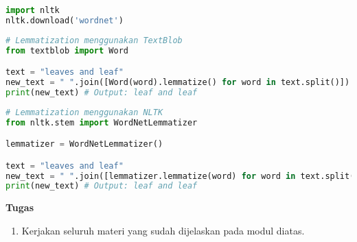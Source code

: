 \documentclass{article}
\begin{document}
    \begin{lstlisting}[language=python, style=pythonstyle]
import nltk
nltk.download('wordnet')
    \end{lstlisting}

    \begin{lstlisting}[language=python, style=pythonstyle]
# Lemmatization menggunakan TextBlob
from textblob import Word

text = "leaves and leaf"
new_text = " ".join([Word(word).lemmatize() for word in text.split()])
print(new_text) # Output: leaf and leaf
    \end{lstlisting}
    
    \begin{lstlisting}[language=python, style=pythonstyle]
# Lemmatization menggunakan NLTK
from nltk.stem import WordNetLemmatizer

lemmatizer = WordNetLemmatizer()

text = "leaves and leaf"
new_text = " ".join([lemmatizer.lemmatize(word) for word in text.split()])
print(new_text) # Output: leaf and leaf
    \end{lstlisting}

    \newpage
    \begin{flushleft}
        \textbf{Tugas}
        \newline

        \begin{enumerate}
            \item Kerjakan seluruh materi yang sudah dijelaskan pada modul diatas.
        \end{enumerate}
    \end{flushleft}
\end{document}
